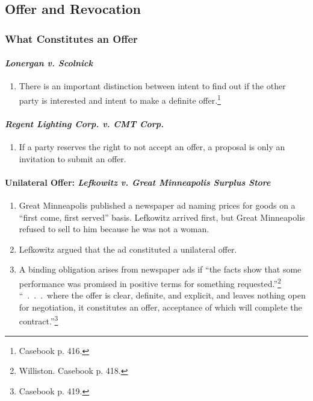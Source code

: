 \subsection{Offer and Revocation}

\subsubsection{What Constitutes an Offer}

\paragraph{\emph{Lonergan v. Scolnick}}

\begin{enumerate}
    \item There is an important distinction between intent to find out if the 
    other party is interested and intent to make a definite 
    offer.\footnote{Casebook p. 416.}
\end{enumerate}

\paragraph{\emph{Regent Lighting Corp. v. CMT Corp.}}

\begin{enumerate}
    \item If a party reserves the right to not accept an offer, a proposal is 
    only an invitation to submit an offer.
\end{enumerate}

\paragraph{Unilateral Offer: \emph{Lefkowitz v. Great Minneapolis Surplus 
Store}}

\begin{enumerate}
    \item Great Minneapolis published a newspaper ad naming prices for goods 
    on a ``first come, first served'' basis. Lefkowitz arrived first, but 
    Great Minneapolis refused to sell to him because he was not a woman.
    \item Lefkowitz argued that the ad constituted a unilateral offer.
    \item A binding obligation arises from newspaper ads if ``the facts show 
    that some performance was promised in positive terms for something 
    requested.''\footnote{Williston. Casebook p.  418.} ``~.~.~.~where the 
    offer is clear, definite, and explicit, and leaves nothing open for 
    negotiation, it constitutes an offer, acceptance of which will complete 
    the contract.''\footnote{Casebook p. 419.}
\end{enumerate}


